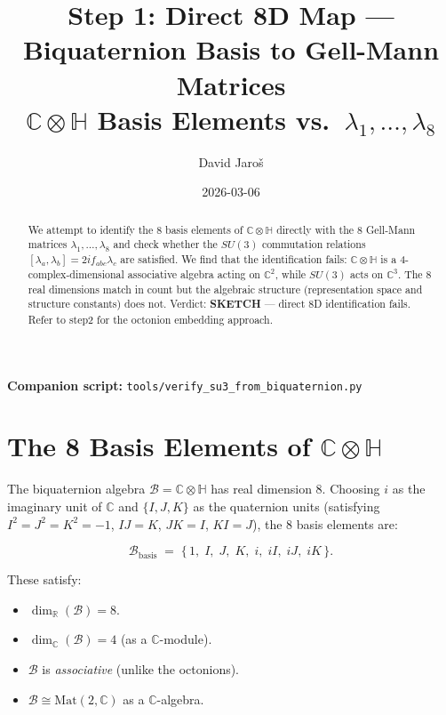 \documentclass[12pt,a4paper]{article}
\title{\textbf{Step 1: Direct 8D Map --- Biquaternion Basis to Gell-Mann Matrices}\\
         \large $\mathbb{C}\otimes\mathbb{H}$ Basis Elements vs.\ $\lambda_1,\ldots,\lambda_8$}
\author{David Jaro\v{s}}
\date{2026-03-06}
\theoremstyle{definition}
\theoremstyle{remark}
\begin{document}
  \maketitle

  \begin{abstract}
  We attempt to identify the 8 basis elements of $\mathbb{C}\otimes\mathbb{H}$
  directly with the 8 Gell-Mann matrices $\lambda_1,\ldots,\lambda_8$ and
  check whether the $SU(3)$ commutation relations
  $[\lambda_a,\lambda_b] = 2if_{abc}\lambda_c$ are satisfied.
  We find that the identification fails: $\mathbb{C}\otimes\mathbb{H}$ is a
  4-complex-dimensional associative algebra acting on $\mathbb{C}^2$, while
  $SU(3)$ acts on $\mathbb{C}^3$.  The 8 real dimensions match in count
  but the algebraic structure (representation space and structure constants)
  does not.  Verdict: \textbf{SKETCH} --- direct 8D identification fails.
  Refer to step2 for the octonion embedding approach.
  \end{abstract}

  \noindent\textbf{Companion script:}
  \texttt{tools/verify\_su3\_from\_biquaternion.py}
\fi

\section{The 8 Basis Elements of $\mathbb{C}\otimes\mathbb{H}$}
\label{sec:basis}

The biquaternion algebra $\mathcal{B} = \mathbb{C}\otimes\mathbb{H}$ has
real dimension 8.  Choosing $i$ as the imaginary unit of $\mathbb{C}$
and $\{I, J, K\}$ as the quaternion units (satisfying $I^2 = J^2 = K^2 = -1$,
$IJ = K$, $JK = I$, $KI = J$), the 8 basis elements are:

\begin{equation}
  \mathcal{B}_{\mathrm{basis}} \;=\;
  \bigl\{\,1,\; I,\; J,\; K,\; i,\; iI,\; iJ,\; iK\,\bigr\}.
  \label{eq:basis}
\end{equation}

These satisfy:
\begin{itemize}
  \item $\dim_\mathbb{R}(\mathcal{B}) = 8$.
  \item $\dim_\mathbb{C}(\mathcal{B}) = 4$ (as a $\mathbb{C}$-module).
  \item $\mathcal{B}$ is \emph{associative} (unlike the octonions).
  \item $\mathcal{B} \cong \mathrm{Mat}(2,\mathbb{C})$ as a $\mathbb{C}$-algebra.
\end{itemize}
\end{document}
